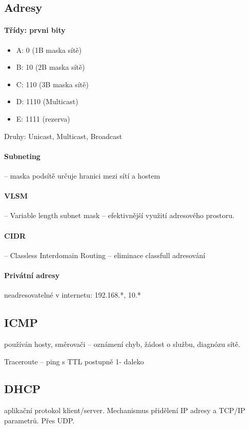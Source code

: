 \documentclass[a4paper, 11pt]{report}
\begin{document}
\subsection{Adresy}
\paragraph{Třídy: prvni bity}
\begin{itemize}
	\item A: 0 (1B maska sítě)
	\item B: 10 (2B maska sítě)
	\item C: 110 (3B maska sítě)
	\item D: 1110 (Multicast)
	\item E: 1111 (rezerva)
\end{itemize}

Druhy: Unicast, Multicast, Broadcast

\paragraph{Subneting} -- maska podsítě určuje hranici mezi sítí a hostem

\paragraph{VLSM} -- Variable length subnet mask -- efektivnější využití adresového prostoru.

\paragraph{CIDR} -- Classless Interdomain Routing -- eliminace classfull adresování

\paragraph{Privátní adresy} neadresovatelné v internetu: 192.168.*, 10.*

\subsection{ICMP}
používán hosty, směrovači -- oznámení chyb, žádost o službu, diagnózu sítě.

Traceroute -- ping s TTL postupně 1- daleko

\subsection{DHCP} aplikační protokol klient/server. Mechanismus přidělení IP adresy a TCP/IP parametrů. Přes UDP.
\end{document}
